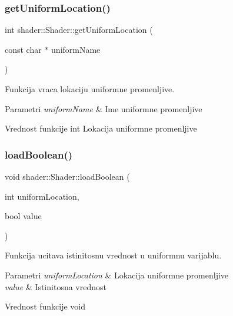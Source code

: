 \subsubsection{\texorpdfstring{get\+Uniform\+Location()}{getUniformLocation()}}
{\footnotesize\ttfamily int shader\+::\+Shader\+::get\+Uniform\+Location (\begin{DoxyParamCaption}\item[{const char $\ast$}]{uniform\+Name }\end{DoxyParamCaption})}



Funkcija vraca lokaciju uniformne promenljive. 


\begin{DoxyParams}{Parametri}
{\em uniform\+Name} & Ime uniformne promenljive \\
\hline
\end{DoxyParams}
\begin{DoxyReturn}{Vrednost funkcije}
int Lokacija uniformne promenljive 
\end{DoxyReturn}
\mbox{\label{classshader_1_1Shader_acb1ec74c8d2ad5218669ece88a6dd491}} 
\subsubsection{\texorpdfstring{load\+Boolean()}{loadBoolean()}}
{\footnotesize\ttfamily void shader\+::\+Shader\+::load\+Boolean (\begin{DoxyParamCaption}\item[{int}]{uniform\+Location,  }\item[{bool}]{value }\end{DoxyParamCaption})}



Funkcija ucitava istinitosnu vrednost u uniformnu varijablu. 


\begin{DoxyParams}{Parametri}
{\em uniform\+Location} & Lokacija uniformne promenljive \\
\hline
{\em value} & Istinitosna vrednost \\
\hline
\end{DoxyParams}
\begin{DoxyReturn}{Vrednost funkcije}
void 
\end{DoxyReturn}
\mbox{\label{classshader_1_1Shader_a124ef086687ad7bcb0050c9fd1b13a24}} 
